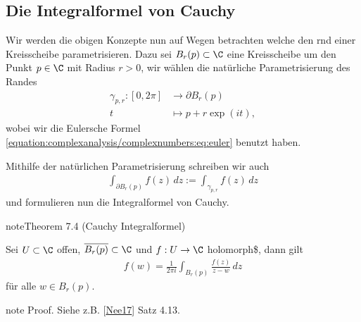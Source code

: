 \documentclass[letterpaper,10pt,german]{jupyterBook}
\begin{document}
\subsection{Die Integralformel von Cauchy}
\label{\detokenize{complexanalysis/cauchyintegral:die-integralformel-von-cauchy}}
\sphinxAtStartPar
Wir werden die obigen Konzepte nun auf Wegen betrachten welche den rnd einer Kreisscheibe parametrisieren. Dazu sei \(B_r(p)\subset\C\) eine Kreisscheibe um den Punkt \(p\in\C\) mit Radius \(r>0\), wir wählen die natürliche Parametrisierung des Randes
\begin{equation*}
\begin{split}\gamma_{p,r}:[0,2\pi]&\to \partial B_r(p)\\
t&\mapsto p + r\exp(i t),\end{split}
\end{equation*}
\sphinxAtStartPar
wobei wir die Eulersche Formel \eqref{equation:complexanalysis/complexnumbers:eq:euler} benutzt haben.

\sphinxAtStartPar
Mithilfe der natürlichen Parametrisierung schreiben wir auch
\begin{equation*}
\begin{split}\int_{\partial B_r(p)} f(z)\, dz := \int_{\gamma_{p,r}} f(z)\, dz\end{split}
\end{equation*}
\sphinxAtStartPar
und formulieren nun die Integralformel von Cauchy.
\label{complexanalysis/cauchyintegral:theorem-8}
\begin{sphinxadmonition}{note}{Theorem 7.4 (Cauchy Integralformel)}



\sphinxAtStartPar
Sei \(U \subset \C\) offen, \(\overline{B_r(p)}\subset \C\) und \(f:U\to \C\) holomorph\$, dann gilt
\begin{equation*}
\begin{split}f(w) = \frac{1}{2\pi i} \int_{B_r(p)} \frac{f(z)}{z-w}\, dz\end{split}
\end{equation*}
\sphinxAtStartPar
für alle \(w\in B_r(p)\).
\end{sphinxadmonition}

\begin{sphinxadmonition}{note}
\sphinxAtStartPar
Proof. Siehe z.B. {[}\hyperlink{cite.references:id13}{Nee17}{]} Satz 4.13.
\end{sphinxadmonition}
\end{document}
